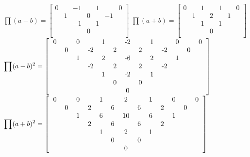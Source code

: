 \documentclass[UTF8]{ctexart}
\begin{document}
$ \displaystyle \prod (a-b)=\left[\begin{matrix}
	0& &-1& &1& &0\\
	&1& &0& &-1&\\
	& &-1& &1& & \\
	& & &0& & &\\
\end{matrix}\right] $
$ \displaystyle \prod (a+b)= \left[\begin{matrix}
	0& &1& &1& &0\\
	&1& &2& &1&\\
	& &1& &1& & \\
	& & &0& & &\\
\end{matrix}\right]$\\
$\displaystyle \prod (a-b)^{2}=
\left[\begin{matrix}
	\begin{tabular}{ccccccccccccc}
		0& &0& &1& &-2& &1& &0& &0\\
		&0& &-2& &2& &2& &-2& &0&\\
		& &1& &2& &-6& &2& &1& &\\
		& & &-2& &2& &2& &-2& & &\\
		& & & &1& &-2& &1& & & &\\
		& & & & &0& &0& & & & &\\
		& & & & & &0& & & & & &\\
	\end{tabular}
\end{matrix}\right]$\\
$\displaystyle \prod (a+b)^{2}=
\left[\begin{matrix}
	\begin{tabular}{ccccccccccccc}
		0& &0& &1& &2& &1& &0& &0\\
		&0& &2& &6& &6& &2& &0&\\
		& &1& &6& &10& &6& &1& &\\
		& & &2& &6& &6& &2& & &\\
		& & & &1& &2& &1& & & &\\
		& & & & &0& &0& & & & &\\
		& & & & & &0& & & & & &\\
	\end{tabular}
\end{matrix}\right] $
\end{document}
